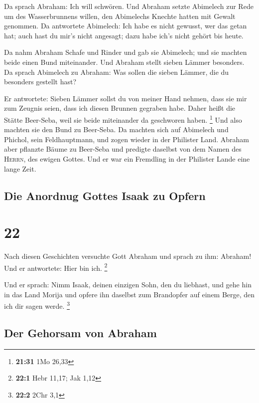  Da sprach Abraham: Ich will schwören. 
Und Abraham setzte Abimelech zur Rede um des Wasserbrunnens willen, den
Abimelechs Knechte hatten mit Gewalt genommen.  Da
antwortete Abimelech: Ich habe es nicht gewusst, wer das getan hat; auch
hast du mir's nicht angesagt; dazu habe ich's nicht gehört bis heute.

 Da nahm Abraham Schafe und Rinder und gab sie Abimelech;
und sie machten beide einen Bund miteinander.  Und
Abraham stellt sieben Lämmer besonders.  Da sprach
Abimelech zu Abraham: Was sollen die sieben Lämmer, die du besonders
gestellt hast?

 Er antwortete: Sieben Lämmer sollst du von meiner Hand
nehmen, dass sie mir zum Zeugnis seien, dass ich diesen Brunnen gegraben
habe.  Daher heißt die Stätte Beer-Seba, weil sie beide
miteinander da geschworen haben. \footnote{\textbf{21:31} 1Mo 26,33}
 Und also machten sie den Bund zu Beer-Seba. Da machten
sich auf Abimelech und Phichol, sein Feldhauptmann, und zogen wieder in
der Philister Land.  Abraham aber pflanzte Bäume zu
Beer-Seba und predigte daselbst von dem Namen des \textsc{Herrn}, des
ewigen Gottes.  Und er war ein Fremdling in der Philister
Lande eine lange Zeit.

\hypertarget{die-anordnug-gottes-isaak-zu-opfern}{%
\subsection{Die Anordnug Gottes Isaak zu
Opfern}\label{die-anordnug-gottes-isaak-zu-opfern}}

\hypertarget{section-21}{%
\section{22}\label{section-21}}

 Nach diesen Geschichten versuchte Gott Abraham und sprach
zu ihm: Abraham! Und er antwortete: Hier bin ich. \footnote{\textbf{22:1}
  Hebr 11,17; Jak 1,12}

 Und er sprach: Nimm Isaak, deinen einzigen Sohn, den du
liebhast, und gehe hin in das Land Morija und opfere ihn daselbst zum
Brandopfer auf einem Berge, den ich dir sagen werde. \footnote{\textbf{22:2}
  2Chr 3,1}

\hypertarget{der-gehorsam-von-abraham}{%
\subsection{Der Gehorsam von Abraham}\label{der-gehorsam-von-abraham}}

